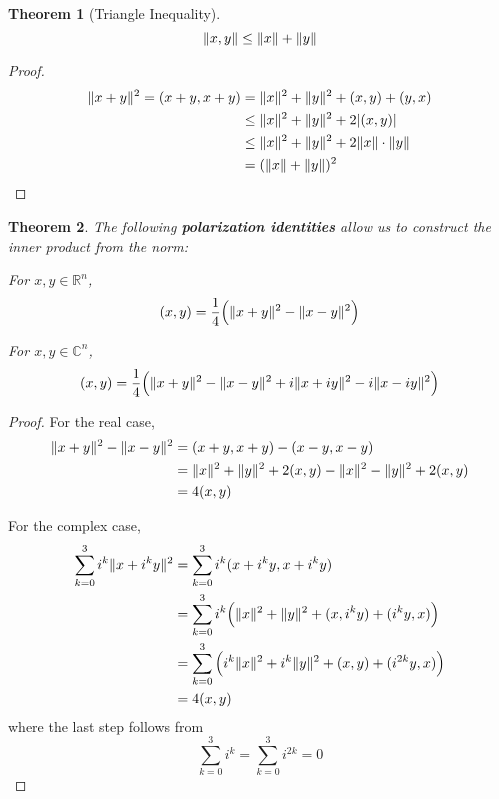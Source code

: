 \documentclass[a4paper,10pt]{book}
\DeclarePairedDelimiter\abs{\lvert}{\rvert}
\DeclarePairedDelimiter{\norm}{\lVert}{\rVert}
\theoremstyle{plain}
\newtheorem{theorem}{Theorem}[section]
\theoremstyle{plain}
\theoremstyle{remark}
\theoremstyle{definition}
\begin{document}
\begin{theorem}[Triangle Inequality]
$$\norm{x, y} \leq \norm{x} + \norm{y}$$
\end{theorem}

\begin{proof}
$$
\begin{aligned}
\norm{x + y}^{2} = (x + y, x + y) &= \norm{x}^{2} + \norm{y}^{2} + (x, y) + (y, x) \\
&\leq \norm{x}^{2} + \norm{y}^{2} + 2 \abs{(x, y)} \\
&\leq \norm{x}^{2} + \norm{y}^{2} + 2 \norm{x} \cdot \norm{y} \\
&= (\norm{x} + \norm{y})^{2}
\end{aligned}
$$
\end{proof}

\begin{theorem}
The following \textbf{polarization identities} allow us to construct the inner product from the norm: 

For $x, y \in \mathbb{R}^{n}$, 
$$(x, y) = \frac{1}{4} \Big( \norm{x + y}^{2} - \norm{x - y}^{2} \Big) $$

For $x, y \in \mathbb{C}^{n}$, 
$$(x, y) = \frac{1}{4} \Big( \norm{x + y}^{2} - \norm{x - y}^{2} +i \norm{x + iy}^{2} -i \norm{x - iy}^{2} \Big)$$
\end{theorem}

\begin{proof}
For the real case, 
$$ 
\begin{aligned}
\norm{x + y}^{2} - \norm{x - y}^{2} &= (x + y, x + y) - (x - y, x - y) \\
&= \norm{x}^{2} + \norm{y}^{2} + 2 (x, y) - \norm{x}^{2} - \norm{y}^{2} + 2 (x, y) \\ 
&= 4 (x, y)
\end{aligned}
$$

For the complex case, 
$$
\begin{aligned}
\sum_{k = 0}^{3} i^{k} \norm{x + i^{k}y}^{2} &= \sum_{k = 0}^{3} i^{k} (x + i^{k}y, x + i^{k}y) \\
&= \sum_{k = 0}^{3} i^{k} \Big( \norm{x}^{2} + \norm{y}^{2} + (x, i^{k}y) + (i^{k}y, x) \Big) \\
&= \sum_{k = 0}^{3} \Big( i^{k} \norm{x}^{2} + i^{k} \norm{y}^{2} + (x, y) + (i^{2k} y, x) \Big) \\
&= 4 (x, y)
\end{aligned}
$$
where the last step follows from 
$$ \sum_{k = 0}^{3} i^{k} = \sum_{k = 0}^{3} i^{2k} = 0$$
\end{proof}
\end{document}

